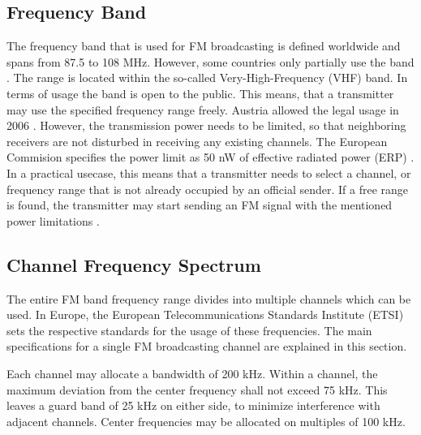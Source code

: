 \documentclass[conference]{IEEEtran}
\begin{document}
  \subsection{Frequency Band}
    The frequency band that is used for FM broadcasting is defined worldwide and spans from 87.5 to 108 MHz.
    However, some countries only partially use the band \cite{ref_itu_regulations}.
    The range is located within the so-called Very-High-Frequency (VHF) band.
    In terms of usage the band is open to the public.
    This means, that a transmitter may use the specified frequency range freely.
    Austria allowed the legal usage in 2006 \cite{ref_austria_rundfunkgesetz_2006}.
    However, the transmission power needs to be limited, so that neighboring receivers are not disturbed in receiving any existing channels.
    The European Commision specifies the power limit as 50 nW of effective radiated power (ERP) \cite{ref_eu_commision_radio_spectrum}.
    In a practical usecase, this means that a transmitter needs to select a channel, or frequency range that is not already occupied by an official sender.
    If a free range is found, the transmitter may start sending an FM signal with the mentioned power limitations \cite{ref_ebu_fm_modulators_in_europe_power_regulations}.


  \subsection{Channel Frequency Spectrum}
    The entire FM band frequency range divides into multiple channels which can be used.
    In Europe, the European Telecommunications Standards Institute (ETSI) sets the respective standards for the usage of these frequencies.
    The main specifications for a single FM broadcasting channel are explained in this section.

    Each channel may allocate a bandwidth of 200 kHz.
    Within a channel, the maximum deviation from the center frequency shall not exceed 75 kHz.
    This leaves a guard band of 25 kHz on either side, to minimize interference with adjacent channels.
    Center frequencies may be allocated on multiples of 100 kHz.
\end{document}
